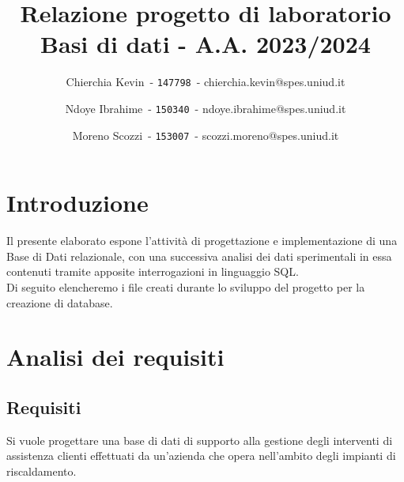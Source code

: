 \documentclass{article}
\title{Relazione progetto di laboratorio \\ Basi di dati - A.A. 2023/2024}
\author{
    Chierchia Kevin\ -
	\texttt{147798}\ -
	{chierchia.kevin@spes.uniud.it}
    \and
	Ndoye Ibrahime\ -
	\texttt{150340}\ -
	{ndoye.ibrahime@spes.uniud.it}
	\and
	Moreno Scozzi\ -
	\texttt{153007}\ -
	{scozzi.moreno@spes.uniud.it}
	}
\begin{document}
\setlength{\parindent}{25pt}
\setlength{\parskip}{5pt}
\graphicspath{{./img/}}
\maketitle
{
    \newpage
    \hypersetup{linkcolor=black}
    \tableofcontents
}

\newpage

\section{Introduzione}

Il presente elaborato espone l’attività di progettazione e implementazione di una Base di Dati relazionale, con una
successiva analisi dei dati sperimentali in essa contenuti tramite apposite interrogazioni in linguaggio SQL. \\
Di seguito elencheremo i file creati durante lo sviluppo del progetto per la creazione di database. \\

\section{Analisi dei requisiti}

\subsection{Requisiti}

Si vuole progettare una base di dati di supporto alla gestione degli interventi di assistenza clienti effettuati da un’azienda che opera nell’ambito degli impianti di riscaldamento.\\
\end{document}
